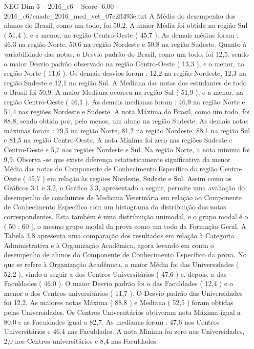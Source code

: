 \begin{textsample}{NEG Dim 3 – 2016\_c6 – Score -6.00 – 2016\_c6/enade\_2016\_med\_vet\_07e2ff493e.txt}
A Média do desempenho dos alunos do Brasil, como um todo, foi 50,2.
A maior Média foi obtida na região Sul ( 51,4 ), e a menor, na região Centro-Oeste ( 45,7 ).
As demais médias foram : 46,3 na região Norte, 50,6 na região Nordeste e 50,8 na região Sudeste.
Quanto à variabilidade das notas, o Desvio padrão do Brasil, como um todo, foi 12,5, sendo o maior Desvio padrão observado na região Centro-Oeste ( 13,3 ), e o menor, na região Norte ( 11,6 ).
Os demais desvios foram : 12,2 na região Nordeste, 12,3 na região Sudeste e 12,1 na região Sul.
A Mediana das notas dos estudantes de todo o Brasil foi 50,9.
A maior Mediana ocorreu na região Sul ( 51,9 ), e a menor, na região Centro-Oeste ( 46,1 ).
As demais medianas foram : 46,9 na região Norte e 51,4 nas regiões Nordeste e Sudeste.
A nota Máxima do Brasil, como um todo, foi 88,8, sendo obtida por, pelo menos, um aluno na região Sudeste.
As demais notas máximas foram : 79,5 na região Norte, 81,2 na região Nordeste, 88,1 na região Sul e 81,5 na região Centro-Oeste.
A nota Mínima foi zero nas regiões Sudeste e Centro-Oeste e 5,7 nas regiões Nordeste e Sul.
Na região Norte, a nota mínima foi 9,9.
Observa -se que existe diferença estatisticamente significativa da menor Média das notas do Componente de Conhecimento Específico da região Centro-Oeste ( 45,7 ) em relação às regiões Nordeste, Sudeste e Sul.
Assim como os Gráficos 3.1 e 3.2, o Gráfico 3.3, apresentado a seguir, permite uma avaliação do desempenho de concluintes de Medicina Veterinária em relação ao Componente de Conhecimento Específico com um histograma da distribuição das notas correspondentes.
Esta também é uma distribuição unimodal, e o grupo modal é o ( 50 ; 60 ], o mesmo grupo modal da prova como um todo da Formação Geral.
A Tabela 3.8 apresenta uma comparação dos resultados em relação à Categoria Administrativa e à Organização Acadêmica, agora levando em conta o desempenho de alunos do Componente de Conhecimento Específico da prova.
No que se refere à Organização Acadêmica, a maior Média foi das Universidades ( 52,2 ), vindo a seguir a dos Centros Universitários ( 47,6 ) e, depois, a das Faculdades ( 46,0 ).
O maior Desvio padrão foi o das Faculdades ( 12,4 ) e o menor o dos Centros universitários ( 11,7 ).
O Desvio padrão das Universidades foi 12,2.
As maiores notas Máxima ( 88,8 ) e Mediana ( 52,5 ) foram obtidas pelas Universidades.
Os Centros Universitários obtiveram nota Máxima igual a 80,0 e as Faculdades igual a 82,7.
As medianas foram : 47,6 nos Centros Universitários e 46,4 nas Faculdades.
A nota Mínima foi zero nas Universidades, 2,0 nos Centros universitários e 8,4 nas Faculdades.

\end{textsample}

